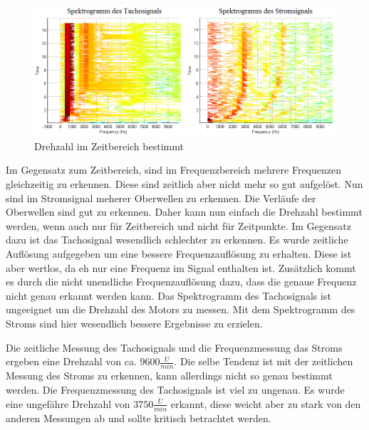 \documentclass{article}%
\begin{document}
	\begin{figure}[htb]
	\centering
	\includegraphics[width=1\textwidth]{frequenzsignale.png}
	\caption{Drehzahl im Zeitbereich bestimmt}
	\end{figure}

	Im Gegensatz zum Zeitbereich, sind im Frequenzbereich mehrere Frequenzen gleichzeitig zu erkennen. 
	Diese sind zeitlich aber nicht mehr so gut aufgelöst. Nun sind im Stromsignal meherer 
	Oberwellen zu erkennen. Die Verläufe der Oberwellen sind gut zu erkennen. Daher kann nun 
	einfach die Drehzahl bestimmt werden, wenn auch nur für 
	Zeitbereich und nicht für Zeitpunkte. Im Gegensatz dazu ist das Tachosignal wesendlich 
	schlechter zu erkennen. Es wurde zeitliche Auflösung aufgegeben um eine bessere Frequenzauflösung 
	zu erhalten. Diese ist aber wertlos, da eh nur eine Frequenz im Signal enthalten ist. 
	Zusätzlich kommt es durch die nicht unendliche Frequenzauflösung dazu, dass 
	die genaue Frequenz nicht genau erkannt werden kann. Das Spektrogramm des
	Tachosignals ist ungeeignet um die Drehzahl des Motors zu messen. Mit dem Spektrogramm des 
	Stroms sind hier wesendlich bessere Ergebnisse zu erzielen.


	Die zeitliche Messung des Tachosignals und die Frequenzmessung das Stroms ergeben eine 
	Drehzahl von ca. $9600\frac{U}{min}$. Die selbe Tendenz ist mit der
	zeitlichen Messung des Stroms zu erkennen, kann allerdings nicht so genau bestimmt werden. 
	Die Frequenzmessung des Tachosignals ist viel zu ungenau. Es wurde eine ungefähre Drehzahl von 
	$3750\frac{U}{min}$ erkannt, diese weicht aber zu stark von den anderen
	Messungen ab und sollte kritisch betrachtet werden.
\end{document}
